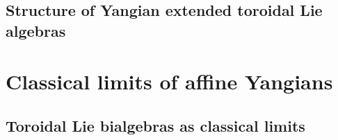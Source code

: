             \minitoc
        
           
    
           

           
    
        \newpage
    
        \chapter{Structure of Yangian extended toroidal Lie algebras} \label{chapter: yangian_EALAs}
            \begin{abstract}
                In this chapter, we attempt to construct , which are to be extensions $\extendedtoroidal$ of a certain Lie algebra of derivations by the toroidal Lie algebra $\toroidal := \uce(\g[v^{\pm 1}, t^{\pm 1}])$. This is to rectify the problem whereby any invariant symmetric bilinear form on $\toroidal$ is necessarily degenerate, which can result in difficulties both when dealing with the representation theory of $\toroidal$ itself and when we study  later on in chapter \ref{chapter: classical_limits_of_affine_yangians}.
            \end{abstract}
    
            \minitoc
        
            
    
            

            
    
            
    
        \newpage

    \part{Classical limits of affine Yangians} 
        \chapter{Toroidal Lie bialgebras as classical limits} \label{chapter: classical_limits_of_affine_yangians}
            \begin{abstract}
                
            \end{abstract}
    

